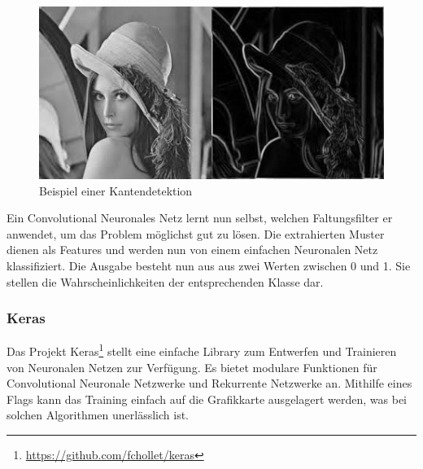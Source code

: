 \begin{figure}[H]
	\centering
	\includegraphics{images/kantendetektion.jpg}
	\caption{Beispiel einer Kantendetektion}
\end{figure}
Ein Convolutional Neuronales Netz lernt nun selbst, welchen Faltungsfilter er anwendet, um das Problem möglichst gut zu lösen. Die extrahierten Muster dienen als Features und werden nun von einem einfachen Neuronalen Netz klassifiziert. Die Ausgabe besteht nun aus aus zwei Werten zwischen 0 und 1. Sie stellen die Wahrscheinlichkeiten der entsprechenden Klasse dar.

\subsubsection{Keras}
Das Projekt \Gls{Keras}\footnote{\url{https://github.com/fchollet/keras}} stellt eine einfache Library zum Entwerfen und Trainieren von Neuronalen Netzen zur Verfügung. Es bietet modulare Funktionen für Convolutional Neuronale Netzwerke und Rekurrente Netzwerke an. Mithilfe eines Flags kann das Training einfach auf die Grafikkarte ausgelagert werden, was bei solchen Algorithmen unerlässlich ist.
\newpage